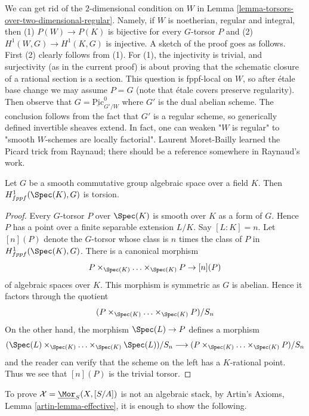 \begin{remark}
\label{remark-torsors-over-regular}
We can get rid of the $2$-dimensional condition on $W$ in
Lemma \ref{lemma-torsors-over-two-dimensional-regular}.
Namely, if $W$ is noetherian, regular and integral, then
(1) $P(W)\to P(K)$ is bijective for every $G$-torsor $P$ and
(2) $H^1(W,G)\to H^1(K,G)$ is injective.
A sketch of the proof goes as follows.
First (2) clearly follows from (1). For (1), the
injectivity is trivial, and surjectivity (as in the current proof)
is about proving that the schematic closure of a rational section
is a section. This question is fppf-local on $W$, so after \'etale base
change we may assume $P=G$ (note that \'etale covers preserve regularity).
Then observe that $G=\underline{\mathrm{Pic}}^0_{G'/W}$ where $G'$
is the dual abelian scheme. The conclusion follows from the fact
that $G'$ is a regular scheme, so generically defined invertible
sheaves extend. In fact, one can weaken "$W$ is regular" to
"smooth $W$-schemes are locally factorial". Laurent Moret-Bailly
learned the Picard trick from Raynaud; there should be a reference
somewhere in Raynaud's work.
\end{remark}

\begin{lemma}
\label{lemma-torsors-over-field-torsion}
Let $G$ be a smooth commutative group algebraic space over a field $K$.
Then $H^1_{fppf}(\Spec(K), G)$ is torsion.
\end{lemma}

\begin{proof}
Every $G$-torsor $P$ over $\Spec(K)$ is smooth over $K$ as a form of $G$.
Hence $P$ has a point over a finite separable extension $L/K$.
Say $[L : K] = n$. Let $[n](P)$ denote the $G$-torsor whose class is $n$
times the class of $P$ in $H^1_{fppf}(\Spec(K), G)$. There is a canonical
morphism
$$
P \times_{\Spec(K)} \ldots \times_{\Spec(K)} P \to [n](P)
$$
of algebraic spaces over $K$. This morphism is symmetric as
$G$ is abelian. Hence it factors through the quotient
$$
(P \times_{\Spec(K)} \ldots \times_{\Spec(K)} P)/S_n
$$
On the other hand, the morphism $\Spec(L) \to P$ defines a morphism
$$
(\Spec(L) \times_{\Spec(K)} \ldots \times_{\Spec(K)} \Spec(L))/S_n
\longrightarrow (P \times_{\Spec(K)} \ldots \times_{\Spec(K)} P)/S_n
$$
and the reader can verify that the scheme on the left has a $K$-rational
point. Thus we see that $[n](P)$ is the trivial torsor.
\end{proof}

\noindent
To prove $\mathcal{X} = \underline{\Mor}_S(X, [S/A])$
is not an algebraic stack, by
Artin's Axioms, Lemma \ref{artin-lemma-effective},
it is enough to show the following.

